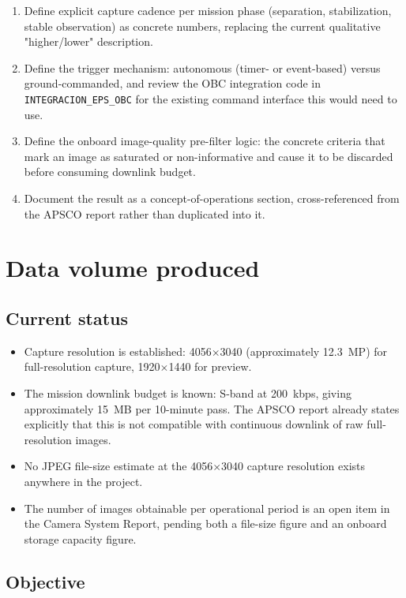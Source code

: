 \begin{enumerate}[leftmargin=*]
    \item Define explicit capture cadence per mission phase (separation, stabilization, stable observation) as concrete numbers, replacing the current qualitative "higher/lower" description.
    \item Define the trigger mechanism: autonomous (timer- or event-based) versus ground-commanded, and review the OBC integration code in \texttt{INTEGRACION\_EPS\_OBC} for the existing command interface this would need to use.
    \item Define the onboard image-quality pre-filter logic: the concrete criteria that mark an image as saturated or non-informative and cause it to be discarded before consuming downlink budget.
    \item Document the result as a concept-of-operations section, cross-referenced from the APSCO report rather than duplicated into it.
\end{enumerate}

\section{Data volume produced}

\subsection{Current status}

\begin{itemize}
    \item Capture resolution is established: 4056$\times$3040 (approximately 12.3~MP) for full-resolution capture, 1920$\times$1440 for preview.
    \item The mission downlink budget is known: S-band at 200~kbps, giving approximately 15~MB per 10-minute pass. The APSCO report already states explicitly that this is not compatible with continuous downlink of raw full-resolution images.
    \item No JPEG file-size estimate at the 4056$\times$3040 capture resolution exists anywhere in the project.
    \item The number of images obtainable per operational period is an open item in the Camera System Report, pending both a file-size figure and an onboard storage capacity figure.
\end{itemize}

\subsection{Objective}

